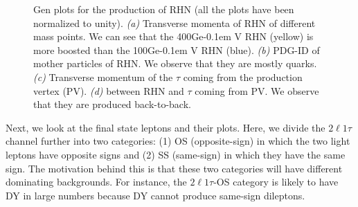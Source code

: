 \documentclass[letterpaper,12pt]{article}
\newcommand{\GeV}{{Ge\kern -0.1em V}}
\begin{document}
\begin{figure}[h]
\caption[RHN gen plots]{Gen plots for the production of RHN (all the plots have been normalized to unity). \emph{(a)} Transverse momenta of RHN of different mass points. We can see that the 400\GeV{} RHN (yellow) is more boosted than the 100\GeV{} RHN (blue). \emph{(b)} PDG-ID of mother particles of RHN. We observe that they are mostly quarks. \emph{(c)} Transverse momentum of the $\tau$ coming from the production vertex (PV). \emph{(d)} \DeltaR{} between RHN and $\tau$ coming from PV. We observe that they are produced back-to-back.}

\label{fig:gen}  
\end{figure}
\clearpage

Next, we look at the final state leptons and their plots. Here, we divide the $2\ell1\tau$ channel further into two categories: (1) OS (opposite-sign) in which the two light leptons have opposite signs and (2) SS (same-sign) in which they have the same sign. The motivation behind this is that these two categories will have different dominating backgrounds. For instance, the $2\ell1\tau$-OS category is likely to have DY in large numbers because DY cannot produce same-sign dileptons.
\end{document}
